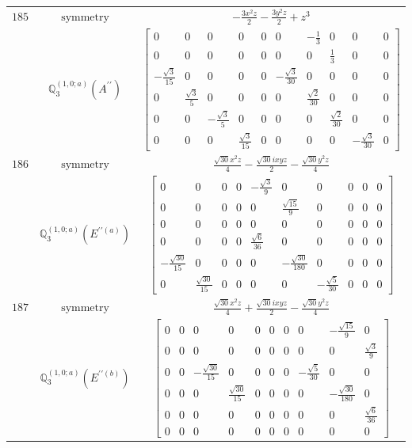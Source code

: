 \documentclass[fleqn,8pt,landscape]{jsarticle}
\begin{document}
\begin{longtable}{ccc}
$ 185 $ & $ \text{symmetry} $ & $ - \frac{3 x^{2} z}{2} - \frac{3 y^{2} z}{2} + z^{3} $ \\
$  $ & $ \mathbb{Q}_{3}^{(1,0;a)}(A^{\prime\prime}) $ & $ \begin{bmatrix} 0 & 0 & 0 & 0 & 0 & 0 & - \frac{1}{3} & 0 & 0 & 0 \\ 0 & 0 & 0 & 0 & 0 & 0 & 0 & \frac{1}{3} & 0 & 0 \\ - \frac{\sqrt{3}}{15} & 0 & 0 & 0 & 0 & - \frac{\sqrt{3}}{30} & 0 & 0 & 0 & 0 \\ 0 & \frac{\sqrt{3}}{5} & 0 & 0 & 0 & 0 & \frac{\sqrt{2}}{30} & 0 & 0 & 0 \\ 0 & 0 & - \frac{\sqrt{3}}{5} & 0 & 0 & 0 & 0 & \frac{\sqrt{2}}{30} & 0 & 0 \\ 0 & 0 & 0 & \frac{\sqrt{3}}{15} & 0 & 0 & 0 & 0 & - \frac{\sqrt{3}}{30} & 0 \end{bmatrix} $ \\ \hline
$ 186 $ & $ \text{symmetry} $ & $ \frac{\sqrt{30} x^{2} z}{4} - \frac{\sqrt{30} i x y z}{2} - \frac{\sqrt{30} y^{2} z}{4} $ \\
$  $ & $ \mathbb{Q}_{3}^{(1,0;a)}(E^{\prime\prime(a)}) $ & $ \begin{bmatrix} 0 & 0 & 0 & 0 & - \frac{\sqrt{3}}{9} & 0 & 0 & 0 & 0 & 0 \\ 0 & 0 & 0 & 0 & 0 & \frac{\sqrt{15}}{9} & 0 & 0 & 0 & 0 \\ 0 & 0 & 0 & 0 & 0 & 0 & 0 & 0 & 0 & 0 \\ 0 & 0 & 0 & 0 & \frac{\sqrt{6}}{36} & 0 & 0 & 0 & 0 & 0 \\ - \frac{\sqrt{30}}{15} & 0 & 0 & 0 & 0 & - \frac{\sqrt{30}}{180} & 0 & 0 & 0 & 0 \\ 0 & \frac{\sqrt{30}}{15} & 0 & 0 & 0 & 0 & - \frac{\sqrt{5}}{30} & 0 & 0 & 0 \end{bmatrix} $ \\ \hline
$ 187 $ & $ \text{symmetry} $ & $ \frac{\sqrt{30} x^{2} z}{4} + \frac{\sqrt{30} i x y z}{2} - \frac{\sqrt{30} y^{2} z}{4} $ \\
$  $ & $ \mathbb{Q}_{3}^{(1,0;a)}(E^{\prime\prime(b)}) $ & $ \begin{bmatrix} 0 & 0 & 0 & 0 & 0 & 0 & 0 & 0 & - \frac{\sqrt{15}}{9} & 0 \\ 0 & 0 & 0 & 0 & 0 & 0 & 0 & 0 & 0 & \frac{\sqrt{3}}{9} \\ 0 & 0 & - \frac{\sqrt{30}}{15} & 0 & 0 & 0 & 0 & - \frac{\sqrt{5}}{30} & 0 & 0 \\ 0 & 0 & 0 & \frac{\sqrt{30}}{15} & 0 & 0 & 0 & 0 & - \frac{\sqrt{30}}{180} & 0 \\ 0 & 0 & 0 & 0 & 0 & 0 & 0 & 0 & 0 & \frac{\sqrt{6}}{36} \\ 0 & 0 & 0 & 0 & 0 & 0 & 0 & 0 & 0 & 0 \end{bmatrix} $ \\ \hline

\end{longtable}
\end{document}
